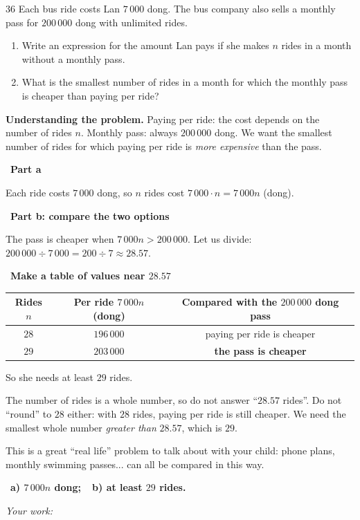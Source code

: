 \documentclass[11pt]{article}
\newif\ifsol \solfalse
\providecommand{\AnsWord}{Đáp số}
\newcommand{\ans}[1]{\par\smallskip{\bfseries\color{tmGreen!88!black}\AnsWord:}\ {\bfseries\color{AnsRed}#1}\par}
\newcommand{\probsol}[1]{%
  \begin{lrbox}{\solmeasure}\begin{minipage}{\dimexpr\linewidth-24pt\relax}#1\end{minipage}\end{lrbox}%
  \ifsol
    \begin{solbox}#1\end{solbox}%
  \else
    \setlength{\solht}{\dimexpr\ht\solmeasure+\dp\solmeasure+0.85cm\relax}%
    \ifdim\solht<1.35cm\setlength{\solht}{1.35cm}\fi
    \ifdim\solht>\StudentMaxWork\setlength{\solht}{\StudentMaxWork}\fi
    \begin{tcolorbox}[colback=white,colframe=Line,boxrule=0.8pt,arc=5pt,
      left=8pt,right=8pt,top=4pt,bottom=4pt,height=\solht]{\footnotesize\color{Slate}\itshape\WorkWord}\end{tcolorbox}%
  \fi}
\newlength{\StudentMaxWork}\setlength{\StudentMaxWork}{7.5cm}
\newcommand{\step}[2]{\par\smallskip\noindent{\bfseries\color{tmBlue!85!black}\StepWord~#1.}\ {\bfseries #2}\par\nopagebreak}
\def\WorkWord{Your work:}
\def\AnsWord{Answer}
\def\StepWord{Step}
\begin{document}
\begin{probbox}{36}{\relax}
Each bus ride costs Lan $7\,000$ dong. The bus company also sells a monthly pass for $200\,000$ dong with unlimited rides.
\begin{enumerate}[label=\alph*),leftmargin=1.6em,itemsep=1pt,topsep=2pt]
\item Write an expression for the amount Lan pays if she makes $n$ rides in a month without a monthly pass.
\item What is the smallest number of rides in a month for which the monthly pass is cheaper than paying per ride?
\end{enumerate}
\end{probbox}
\probsol{
\textbf{Understanding the problem.} Paying per ride: the cost depends on the number of rides $n$. Monthly pass: always $200\,000$ dong. We want the smallest number of rides for which paying per ride is \emph{more expensive} than the pass.
\step{1}{Part a}
Each ride costs $7\,000$ dong, so $n$ rides cost $7\,000\cdot n=7\,000n$ (dong).
\step{2}{Part b: compare the two options}
The pass is cheaper when $7\,000n>200\,000$. Let us divide: $200\,000\div 7\,000=200\div 7\approx 28.57$.
\step{3}{Make a table of values near $28.57$}
\begin{center}
\begin{tabular}{|c|c|c|}
\hline
\rowcolor{tmBlue!10} Rides $n$ & Per ride $7\,000n$ (dong) & Compared with the $200\,000$ dong pass\\ \hline
$28$ & $196\,000$ & paying per ride is cheaper\\ \hline
$29$ & $203\,000$ & \textbf{the pass is cheaper}\\ \hline
\end{tabular}
\end{center}
So she needs at least $29$ rides.
\begin{warnbox}The number of rides is a whole number, so do not answer ``$28.57$ rides''. Do not ``round'' to $28$ either: with $28$ rides, paying per ride is still cheaper. We need the smallest whole number \emph{greater than} $28.57$, which is $29$.\end{warnbox}
\begin{parentbox}This is a great ``real life'' problem to talk about with your child: phone plans, monthly swimming passes... can all be compared in this way.\end{parentbox}
\ans{a) $7\,000n$ dong;\ \ b) at least $29$ rides.}
}
\end{document}
